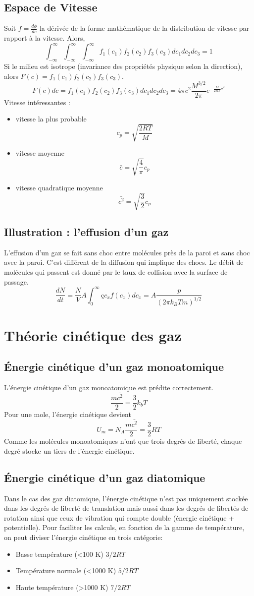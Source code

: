 \documentclass[12pt,a4paper,twoside]{report}
\begin{document}
\subsection{Espace de Vitesse}
Soit $f=\frac{d\phi}{dc}$ la dérivée de la forme mathématique de la distribution de vitesse par rapport à la vitesse. Alors, $$\int_{-\infty}^{\infty}{\int_{-\infty}^{\infty}{\int_{-\infty}^{\infty}{f_1(c_1)f_2(c_2)f_3(c_3)dc_1dc_2dc_3}}}=1$$
Si le milieu est isotrope (invariance des propriétés physique selon la direction), alors $F(c)=f_1(c_1)f_2(c_2)f_3(c_3)$.
$$F(c)dc=f_1(c_1)f_2(c_2)f_3(c_3)dc_1dc_2dc_3=4\pi c^{2} \frac{M^{3/2}}{2\pi} e^{-\frac{M}{2RT}c^{2}}$$
Vitesse intéressantes : 
\begin{itemize}
\item vitesse la plus probable $$c_p=\sqrt{\frac{2RT}{M}}$$
\item vitesse moyenne
$$\bar{c}=\sqrt{\frac{4}{\pi}}c_p$$
\item vitesse quadratique moyenne
$$\bar{c^{2}}=\sqrt{\frac{3}{2}}c_p$$
\end{itemize}
\subsection{Illustration : l'effusion d'un gaz}
L'effusion d'un gaz se fait sans choc entre molécules près de la paroi et sans choc avec la paroi. C'est différent de la diffusion qui implique des chocs.
Le débit de molécules qui passent est donné par le taux de collision avec la surface de passage.
$$\frac{dN}{dt}=\frac{N}{V}A\int_{0}^{\infty}çc_xf(c_x)dc_x=A\frac{p}{(2\pi k_BTm)^{1/2}}$$
\section{Théorie cinétique des gaz}
\subsection{Énergie cinétique d'un gaz monoatomique}
L'énergie cinétique d'un gaz monoatomique est prédite correctement.
$$\frac{m\bar{c^2}}{2}=\frac{3}{2}k_bT$$
Pour une mole, l'énergie cinétique devient
$$U_m=N_A\frac{m\bar{c^2}}{2}=\frac{3}{2}RT$$
Comme les molécules monoatomiques n'ont que trois degrés de liberté, chaque degré stocke un tiers de l'énergie cinétique.

\subsection{Énergie cinétique d'un gaz diatomique}
Dans le cas des gaz diatomique, l'énergie cinétique n'est pas uniquement stockée dans les degrés de liberté de translation mais aussi dans les degrés de libertés de rotation ainsi que ceux de vibration qui compte double (énergie cinétique + potentielle).
Pour faciliter les calculs, en fonction de la gamme de température, on peut diviser l'énergie cinétique en trois catégorie:
\begin{itemize}
 \item Basse température (<100 K) $3/2 RT$
 \item Température normale (<1000 K) $5/2 RT$
 \item Haute température (>1000 K) $7/2 RT$
\end{itemize}
\end{document}
